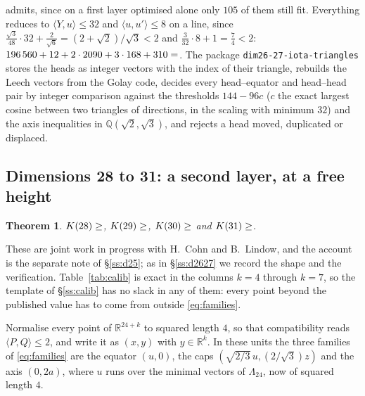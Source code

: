 \documentclass[11pt]{amsart}
\newtheorem{theorem}{Theorem}[section]
\theoremstyle{remark}
\newcommand{\Leech}{\Lambda_{24}}
\newcommand{\ip}[2]{\langle #1,#2\rangle}
\newcommand{\R}{\mathbb{R}}
\begin{document}
admits, since on a first layer optimised alone only $105$ of them still fit.  Everything reduces to
$\ip{Y}{u}\le32$ and $\ip{u}{u'}\le8$ on a line, since
$\tfrac{\sqrt3}{48}\cdot32+\tfrac{2}{\sqrt6}=(2+\sqrt2)/\sqrt3<2$ and
$\tfrac{3}{32}\cdot8+1=\tfrac74<2$:
$196\,560+12+2\cdot2090+3\cdot168+310=\Kh{27}$. The package
\texttt{dim26-27-iota-triangles} stores the heads as integer vectors with the
index of their triangle, rebuilds the Leech vectors from the Golay code, decides
every head--equator and head--head pair by integer comparison against the
thresholds $144-96c$ ($c$ the exact largest cosine between two triangles of
directions, in the scaling with minimum $32$) and the axis inequalities in
$\mathbb{Q}(\sqrt2,\sqrt3)$, and rejects a head moved, duplicated or displaced.

\subsection{Dimensions 28 to 31: a second layer, at a free
height}\label{ss:d293031}

\begin{theorem}\label{thm:293031}
$K(28)\ge\Kh{28}$, $K(29)\ge\Kh{29}$, $K(30)\ge\Kh{30}$ and
$K(31)\ge\Kh{31}$.
\end{theorem}

These are joint work in progress with H.~Cohn and B.~Lindow, and the account is
the separate note of \S\ref{ss:d25}; as in \S\ref{ss:d2627} we record the shape
and the verification. Table~\ref{tab:calib} is exact in the columns $k=4$
through $k=7$, so the template of \S\ref{ss:calib} has no slack in any of them:
every point beyond the published value has to come from outside
\eqref{eq:families}.

Normalise every point of $\R^{24+k}$ to squared length $4$, so that
compatibility reads $\ip{P}{Q}\le2$, and write it as $(x,y)$ with $y\in\R^{k}$.
In these units the three families of \eqref{eq:families} are the equator
$(u,0)$, the caps $(\sqrt{2/3}\,u,(2/\sqrt3)z)$ and the axis $(0,2a)$, where $u$
runs over the minimal vectors of $\Leech$, now of squared length $4$.
\end{document}
